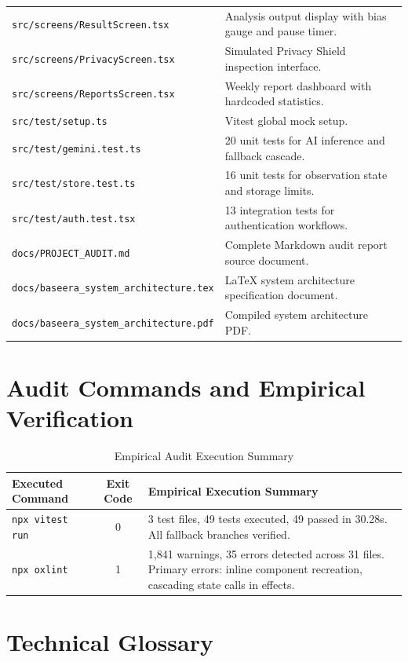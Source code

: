 \documentclass[10pt,a4paper]{report}
\begin{document}
\begin{longtable}{p{5.5cm} p{10.5cm}}
\texttt{src/screens/ResultScreen.tsx} & Analysis output display with bias gauge and pause timer. \\
\texttt{src/screens/PrivacyScreen.tsx} & Simulated Privacy Shield inspection interface. \\
\texttt{src/screens/ReportsScreen.tsx} & Weekly report dashboard with hardcoded statistics. \\
\texttt{src/test/setup.ts} & Vitest global mock setup. \\
\texttt{src/test/gemini.test.ts} & 20 unit tests for AI inference and fallback cascade. \\
\texttt{src/test/store.test.ts} & 16 unit tests for observation state and storage limits. \\
\texttt{src/test/auth.test.tsx} & 13 integration tests for authentication workflows. \\
\texttt{docs/PROJECT\_AUDIT.md} & Complete Markdown audit report source document. \\
\texttt{docs/baseera\_system\_architecture.tex} & LaTeX system architecture specification document. \\
\texttt{docs/baseera\_system\_architecture.pdf} & Compiled system architecture PDF. \\
\end{longtable}

\chapter{Audit Commands and Empirical Verification}

\begin{table}[htbp]
\centering
\small
\caption{Empirical Audit Execution Summary}
\begin{tabularx}{\textwidth}{l c X}
\toprule
\textbf{Executed Command} & \textbf{Exit Code} & \textbf{Empirical Execution Summary} \\
\midrule
\texttt{npx vitest run} & 0 & 3 test files, 49 tests executed, 49 passed in 30.28s. All fallback branches verified. \\
\addlinespace
\texttt{npx oxlint} & 1 & 1,841 warnings, 35 errors detected across 31 files. Primary errors: inline component recreation, cascading state calls in effects. \\
\bottomrule
\end{tabularx}
\end{table}

\chapter{Technical Glossary}
\end{document}
